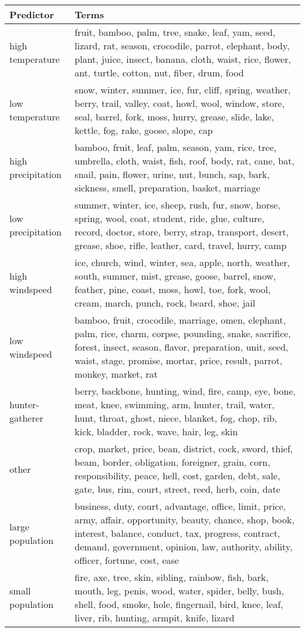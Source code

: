 \begin{table}[ht]
\centering
\begin{tabular}{ll}
  \hline
Predictor & Terms \\ 
  \hline
high temperature & fruit, bamboo, palm, tree, snake, leaf, yam, seed, lizard, rat, season, crocodile, parrot, elephant, body, plant, juice, insect, banana, cloth, waist, rice, flower, ant, turtle, cotton, nut, fiber, drum, food \\ 
  low temperature & snow, winter, summer, ice, fur, cliff, spring, weather, berry, trail, valley, coat, howl, wool, window, store, seal, barrel, fork, moss, hurry, grease, slide, lake, kettle, fog, rake, goose, slope, cap \\ 
  high precipitation & bamboo, fruit, leaf, palm, season, yam, rice, tree, umbrella, cloth, waist, fish, roof, body, rat, cane, bat, snail, pain, flower, urine, nut, bunch, sap, bark, sickness, smell, preparation, basket, marriage \\ 
  low precipitation & summer, winter, ice, sheep, rush, fur, snow, horse, spring, wool, coat, student, ride, glue, culture, record, doctor, store, berry, strap, transport, desert, grease, shoe, rifle, leather, card, travel, hurry, camp \\ 
  high windspeed & ice, church, wind, winter, sea, apple, north, weather, south, summer, mist, grease, goose, barrel, snow, feather, pine, coast, moss, howl, toe, fork, wool, cream, march, punch, rock, beard, shoe, jail \\ 
  low windspeed & bamboo, fruit, crocodile, marriage, omen, elephant, palm, rice, charm, corpse, pounding, snake, sacrifice, forest, insect, season, flavor, preparation, unit, seed, waist, stage, promise, mortar, price, result, parrot, monkey, market, rat \\ 
  hunter-gatherer & berry, backbone, hunting, wind, fire, camp, eye, bone, meat, knee, swimming, arm, hunter, trail, water, hunt, throat, ghost, niece, blanket, fog, chop, rib, kick, bladder, rock, wave, hair, leg, skin \\ 
  other & crop, market, price, bean, district, cock, sword, thief, beam, border, obligation, foreigner, grain, corn, responsibility, peace, hell, cost, garden, debt, sale, gate, bus, rim, court, street, reed, herb, coin, date \\ 
  large population & business, duty, court, advantage, office, limit, price, army, affair, opportunity, beauty, chance, shop, book, interest, balance, conduct, tax, progress, contract, demand, government, opinion, law, authority, ability, officer, fortune, cost, ease \\ 
  small population & fire, axe, tree, skin, sibling, rainbow, fish, bark, mouth, leg, penis, wood, water, spider, belly, bush, shell, food, smoke, hole, fingernail, bird, knee, leaf, liver, rib, hunting, armpit, knife, lizard \\ 
   \hline
\end{tabular}
\end{table}
